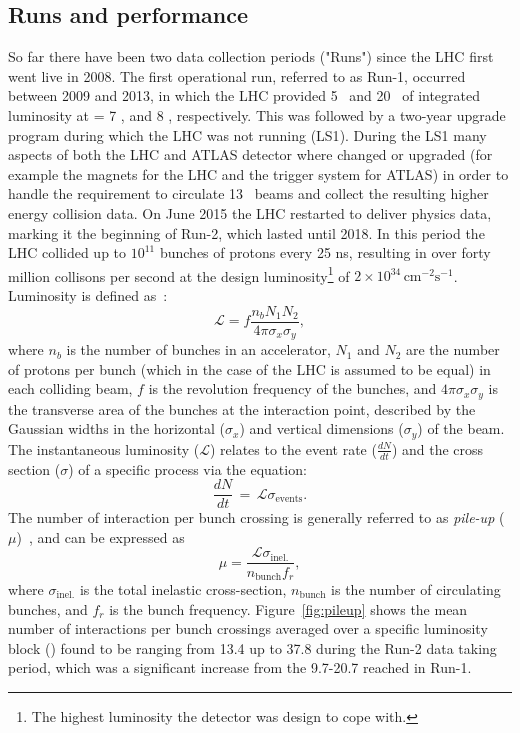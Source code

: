 	\subsection*{Runs and performance}
	So far there have been two data collection periods ("Runs") since the \ac{LHC} first went live in 2008. 
	The first operational run, referred to as Run-1, occurred between 2009 and 2013, in which the \ac{LHC} provided 5 \infb\ and 20 \infb\ of integrated luminosity at \com= 7 \tev, and 8 \tev, respectively. 
	This was followed by a two-year upgrade program during which the \ac{LHC} was not running (\ac{LS1}). 
	During the \ac{LS1} many aspects of both the \ac{LHC} and \ac{ATLAS} detector where changed or upgraded (for example the magnets for the \ac{LHC} and the trigger system for \ac{ATLAS}) in order to handle the requirement to circulate 13 \tev\ beams and collect the resulting higher energy collision data.
	On June 2015 the \ac{LHC} restarted to deliver physics data, marking it the beginning of Run-2, which lasted until 2018.
	 In this period the \ac{LHC} collided up to $10^{11}$ bunches of protons every 25 ns, resulting in over forty million collisons per second at the design luminosity\footnote{The highest luminosity the detector was design to cope with.} of $2\times10^{34}\,\mathrm{cm}^{-2}\mathrm{s}^{-1}$.
	 Luminosity is defined as~\cite{Herr:941318}:
	\begin{equation}
		\mathcal{L}=f\frac{n_bN_1N_2}{4\pi\sigma_x\sigma_y},
	\end{equation}	 
where $n_b$ is the number of bunches in an accelerator, $N_1$ and $N_2$ are the number of protons per bunch (which in the case of the \ac{LHC} is assumed to be equal) in each colliding beam, $f$ is the revolution frequency of the bunches, and $4\pi\sigma_x\sigma_y$ is the transverse area of the bunches at the interaction point, described by the Gaussian widths in the horizontal ($\sigma_x$) and vertical dimensions ($\sigma_y$) of the beam.
The instantaneous luminosity ($\mathcal{L}$) relates to the event rate ($\frac{dN}{dt}$) and the cross section ($\sigma$) of a specific process via the equation:
	\begin{equation}
	\frac{dN}{dt}\,=\,\mathcal{L}\sigma_{\mathrm{events}}.
	\end{equation}
	The number of interaction per bunch crossing is generally referred to as \textit{pile-up} ($\mu$)~\cite{pileup}, and can be expressed as 
	\begin{equation}
	\mu=\frac{\mathcal{L}\sigma_{\mathrm{inel.}}}{n_{\textrm{bunch}}f_r},
	\end{equation}
	where $\sigma_{\mathrm{inel.}}$ is the total inelastic cross-section, $n_{\textrm{bunch}}$ is the number of circulating bunches, and $f_r$ is the bunch frequency. Figure~\ref{fig:pileup} shows the mean number of interactions per bunch crossings averaged over a specific luminosity block (\mubar) found to be ranging from 13.4 up to 37.8 during the Run-2 data taking period,  which was a significant increase from the  9.7-20.7 reached in Run-1.
	\pileup
	
